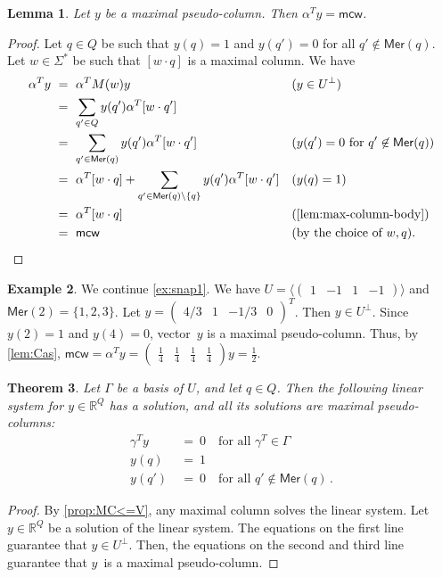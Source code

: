 \documentclass[11pt,a4paper]{amsart}
\newcommand{\spn}[1]{\mathord{\langle #1 \rangle}}
\newcommand{\Mer}{\mathsf{Mer}}
\newcommand{\mcw}{\mathsf{mcw}}
\theoremstyle{plain}
\newtheorem{thm}{Theorem}[section]
\newtheorem{lem}[thm]{Lemma}
\theoremstyle{definition}
\newtheorem{exa}[thm]{Example}
\theoremstyle{defC}
\theoremstyle{thmC}
\theoremstyle{plain}
\numberwithin{equation}{section}
\begin{document}
\begin{lem} \label{lem:Cas}
Let $y$ be a maximal pseudo-column.
Then $\alpha^T y = \mcw$.
\end{lem}
\begin{proof}
Let $q \in Q$ be such that $y(q) = 1$ and $y(q') = 0$ for all $q' \not\in \Mer(q)$.
Let $w \in \Sigma^*$ be such that $[w \cdot q]$ is a maximal column.
We have
\begin{align*}
\alpha^T y \
&= \ \alpha^T M(w) y && (y \in U^\bot) \\
&= \ \sum_{q' \in Q} y(q') \alpha^T [w \cdot q'] \\
&= \ \sum_{q' \in \Mer(q)} y(q') \alpha^T [w \cdot q'] && (y(q') = 0 \text{ for } q' \not\in \Mer(q)) \\
&= \ \alpha^T [w \cdot q] + \sum_{q' \in \Mer(q) \setminus \{q\}} y(q') \alpha^T [w \cdot q'] && (y(q) = 1) \\
&= \ \alpha^T [w \cdot q] && (\text{\autoref{lem:max-column-body}}) \\
&= \ \mcw && (\text{by the choice of $w, q$}). \qedhere
\end{align*}
\end{proof}



\begin{exa} \label{ex:snap2}
We continue \autoref{ex:snap1}.
We have $U = \spn{\begin{pmatrix} 1 & -1 & 1 & -1 \end{pmatrix}}$ and $\Mer(2) = \{1,2,3\}$.
Let $y = \begin{pmatrix}4/3 & 1 & -1/3 & 0\end{pmatrix}^T$.
Then $y \in U^\bot$.
Since $y(2) = 1$ and $y(4) = 0$, vector~$y$ is a maximal pseudo-column.
Thus, by \autoref{lem:Cas}, $\mcw = \alpha^T y = \begin{pmatrix} \frac14 & \frac14 & \frac14 & \frac14 \end{pmatrix} y = \frac12$.
\end{exa}

\begin{thm}\label{thm:pseud-linsyst}
Let $\Gamma$ be a basis of $U$, and let $q \in Q$.
Then the following linear system for $y \in \mathbb{R}^Q$ has a solution, and all its solutions are maximal pseudo-columns:
\begin{align*}
 \gamma^T y \ &= \ 0 \quad \text{for all } \gamma^T \in \Gamma \\
 y(q) \ &= \ 1 \\
 y(q') \ &= \ 0 \quad \text{for all } q' \not \in \Mer(q)\,.
\end{align*}
\end{thm}
\begin{proof}
By \autoref{prop:MC<=V}, any maximal column solves the linear system.
Let $y \in \mathbb{R}^Q$ be a solution of the linear system.
The equations on the first line guarantee that $y \in U^\bot$.
Then, the equations on the second and third line guarantee that $y$~is a maximal pseudo-column.
\end{proof}
\end{document}
